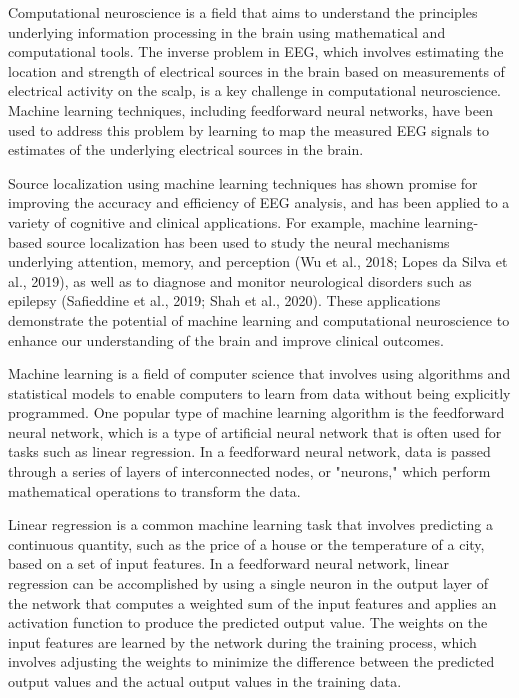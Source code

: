 \documentclass[a4paper, UKenglish, 11pt]{uiomaster}
\begin{document}
Computational neuroscience is a field that aims to understand the principles underlying information processing in the brain using mathematical and computational tools. The inverse problem in EEG, which involves estimating the location and strength of electrical sources in the brain based on measurements of electrical activity on the scalp, is a key challenge in computational neuroscience. Machine learning techniques, including feedforward neural networks, have been used to address this problem by learning to map the measured EEG signals to estimates of the underlying electrical sources in the brain.

Source localization using machine learning techniques has shown promise for improving the accuracy and efficiency of EEG analysis, and has been applied to a variety of cognitive and clinical applications. For example, machine learning-based source localization has been used to study the neural mechanisms underlying attention, memory, and perception (Wu et al., 2018; Lopes da Silva et al., 2019), as well as to diagnose and monitor neurological disorders such as epilepsy (Safieddine et al., 2019; Shah et al., 2020). These applications demonstrate the potential of machine learning and computational neuroscience to enhance our understanding of the brain and improve clinical outcomes.

Machine learning is a field of computer science that involves using algorithms and statistical models to enable computers to learn from data without being explicitly programmed. One popular type of machine learning algorithm is the feedforward neural network, which is a type of artificial neural network that is often used for tasks such as linear regression. In a feedforward neural network, data is passed through a series of layers of interconnected nodes, or "neurons," which perform mathematical operations to transform the data.

Linear regression is a common machine learning task that involves predicting a continuous quantity, such as the price of a house or the temperature of a city, based on a set of input features. In a feedforward neural network, linear regression can be accomplished by using a single neuron in the output layer of the network that computes a weighted sum of the input features and applies an activation function to produce the predicted output value. The weights on the input features are learned by the network during the training process, which involves adjusting the weights to minimize the difference between the predicted output values and the actual output values in the training data.
\end{document}
